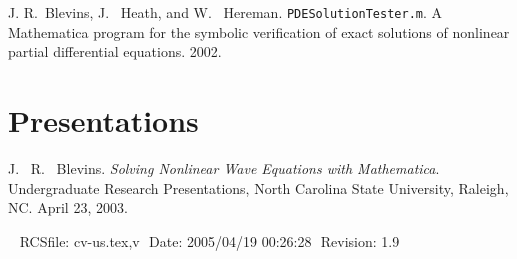 \documentclass[margin,line,11pt,final]{res}
\begin{document}
\begin{resume}
J. R.\ Blevins, J. \ Heath, and W. \ Hereman.
  \texttt{PDESolutionTester.m}.  A Mathematica program for the symbolic
  verification of exact solutions of nonlinear partial differential
  equations. 2002.

\section{\sc Presentations}


J. \ R. \ Blevins. {\em Solving Nonlinear Wave Equations with
Mathematica}. Undergraduate Research Presentations, North Carolina
State University, Raleigh, NC. April 23, 2003.

\vspace{\fill}\ \newline
{\tiny \rm $ $RCSfile: cv-us.tex,v $ $ }
{\tiny \rm $ $Date: 2005/04/19 00:26:28 $ $ }
{\tiny \rm $ $Revision: 1.9 $ $ }

\end{resume}
\end{document}
